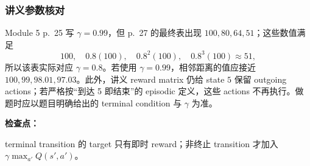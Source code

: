 \subsubsection*{讲义参数核对}

Module 5 p.~25 写 $\gamma=0.99$，但 p.~27 的最终表出现 $100,80,64,51$；这些数值满足
\[
  100,\quad0.8(100),\quad0.8^2(100),\quad0.8^3(100)\approx51,
\]
所以该表实际对应 $\gamma=0.8$。若使用 $\gamma=0.99$，相邻距离的值应接近 $100,99,98.01,97.03$。此外，讲义 reward matrix 仍给 state $5$ 保留 outgoing actions；若严格按“到达 5 即结束”的 episodic 定义，这些 actions 不再执行。做题时应以题目明确给出的 terminal condition 与 $\gamma$ 为准。

\textbf{检查点：}\par
terminal transition 的 target 只有即时 reward；非终止 transition 才加入 $\gamma\max_{a'}Q(s',a')$。
